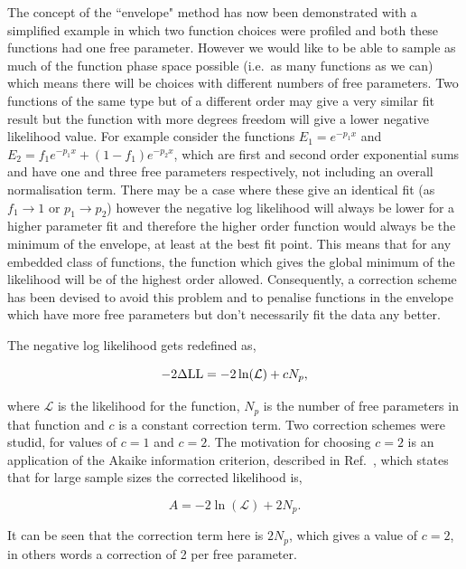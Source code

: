 The concept of the ``envelope" method has now been demonstrated with a simplified example in which two function choices were profiled and both these functions had one free parameter. However we would like to be able to sample as much of the function phase space possible (i.e.~as many functions as we can) which means there will be choices with different numbers of free parameters. Two functions of the same type but of a different order may give a very similar fit result but the function with more degrees freedom will give a lower negative likelihood value. For example consider the functions $E_{1} = e^{-p_{1}x}$ and $E_{2} = f_{1}e^{-p_{1}x}+(1-f_{1})e^{-p_{2}x}$, which are first and second order exponential sums and have one and three free parameters respectively, not including an overall normalisation term. There may be a case where these give an identical fit (as $f_{1}\to 1$ or $p_{1}\to p_{2}$) however the negative log likelihood will always be lower for a higher parameter fit and therefore the higher order function would always be the minimum of the envelope, at least at the best fit point. This means that for any embedded class of functions, the function which gives the global minimum of the likelihood will be of the highest order allowed. Consequently, a correction scheme has been devised to avoid this problem and to penalise functions in the envelope which have more free parameters but don't necessarily fit the data any better.

The negative log likelihood gets redefined as,

\begin{equation}
  -2\Delta\mathrm{LL} = -2\ln(\mathcal{L}) + cN_{p},
\end{equation}

where $\mathcal{L}$ is the likelihood for the function, $N_{p}$ is the number of free parameters in that function and $c$ is a constant correction term. Two correction schemes were studid, for values of $c=1$ and $c=2$. The motivation for choosing $c=2$ is an application of the Akaike information criterion, described in Ref.~\cite{akaike}, which states that for large sample sizes the corrected likelihood is,

\begin{equation}
  A = -2\ln(\mathcal{L}) + 2N_{p}.
\end{equation}

It can be seen that the correction term here is $2N_{p}$, which gives a value of $c=2$, in others words a correction of 2 per free parameter. 

